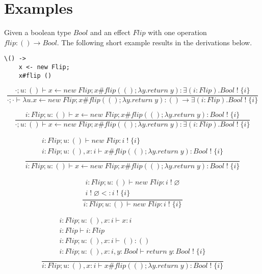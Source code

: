 \documentclass[12pt]{article}
\newcommand\tunit[0]{()}
\newcommand\tarr[2]{#1 \rightarrow #2}
\newcommand\aty[2]{#1 \; ! \; #2}
\newcommand\texists[3]{\exists(#1:#2) . #3}
\newcommand\vunit[0]{()}
\newcommand\vabs[2]{\lambda #1 . #2}
\newcommand\creturn[1]{\textit{return} \; #1}
\newcommand\cdo[3]{#1 \leftarrow #2 ; #3}
\newcommand\copi[5]{#1 \# #2(#3 ; \lambda #4 . #5)}
\newcommand\cnew[1]{\textit{new} \; #1}
\newcommand\subty[2]{#1 <: #2}
\begin{document}
\section{Examples}

Given a boolean type $Bool$ and an effect $Flip$ with one operation\\ $flip : \tarr{\tunit}{Bool}$.
The following short example results in the derivations below.

\begin{verbatim}
\() ->
	x <- new Flip;
	x#flip ()
\end{verbatim}

\[\frac{
	\cdot;u:\tunit \vdash \cdo{x}{\cnew{Flip}}{\copi{x}{flip}{\vunit}{y}{\creturn{y}}} :
	\texists{i}{Flip}{\aty{Bool}{\{i\}}}
}{
	\cdot;\cdot \vdash \vabs{u}{\cdo{x}{\cnew{Flip}}{\copi{x}{flip}{\vunit}{y}{\creturn{y}}}}
	: \tarr{\tunit}{\texists{i}{Flip}{\aty{Bool}{\{i\}}}}
}\]

\[
\frac{
	i:Flip;u:\tunit \vdash \cdo{x}{\cnew{Flip}}{\copi{x}{flip}{\vunit}{y}{\creturn{y}}} :
	\aty{Bool}{\{i\}}
	}{
	\cdot;u:\tunit \vdash \cdo{x}{\cnew{Flip}}{\copi{x}{flip}{\vunit}{y}{\creturn{y}}} :
	\texists{i}{Flip}{\aty{Bool}{\{i\}}}
	}
\]

\[\frac{
\begin{array}{l}
	i:Flip;u:\tunit \vdash \cnew{Flip} : \aty{i}{\{i\}} \\
	i:Flip;u:\tunit,x:i \vdash \copi{x}{flip}{\vunit}{y}{\creturn{y}} : \aty{Bool}{\{i\}} \\
\end{array}
}{
i:Flip;u:\tunit \vdash \cdo{x}{\cnew{Flip}}{\copi{x}{flip}{\vunit}{y}{\creturn{y}}} :
	\aty{Bool}{\{i\}}
}\]

\[\frac{
\begin{array}{l}
i:Flip;u:\tunit \vdash \cnew{Flip} : \aty{i}{\varnothing} \\
\subty{\aty{i}{\varnothing}}{\aty{i}{\{i\}}}
\end{array}
}{
i:Flip;u:\tunit \vdash \cnew{Flip} : \aty{i}{\{i\}}
}\]

\[\frac{
\begin{array}{l}
i:Flip;u:\tunit,x:i \vdash x : i \\
i:Flip \vdash i : Flip \\
i:Flip;u:\tunit,x:i \vdash \vunit : \tunit \\
i:Flip;u:\tunit,x:i,y:Bool \vdash \creturn{y} : \aty{Bool}{\{i\}} \\
\end{array}
}{
i:Flip;u:\tunit,x:i \vdash \copi{x}{flip}{\vunit}{y}{\creturn{y}} : \aty{Bool}{\{i\}}
}\]
\end{document}
